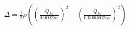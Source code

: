 \documentclass[preview]{standalone}
\begin{document}
\begin{align*}
\Delta  = \frac{1}{2} \rho ((\frac{\dot{Q}_{In}}{0.00025\pi})^2 - (\frac{\dot{Q}_{In}}{0.00000625\pi})^2)
\end{align*}
\end{document}
